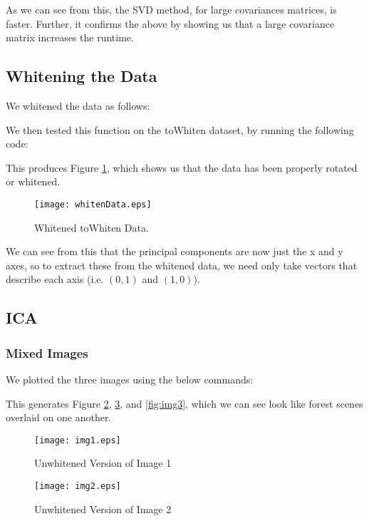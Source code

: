 \documentclass[11pt, oneside]{article}
\begin{document}
As we can see from this, the SVD method, for large covariances matrices, is faster. Further, it confirms the above by showing us that a large covariance matrix increases the runtime.

\subsection{Whitening the Data}

We whitened the data as follows:

We then tested this function on the toWhiten dataset, by running the following code:

This produces Figure \ref{fig:whitenedData}, which shows us that the data has been properly rotated or whitened.

\begin{figure}[ht!]
\texttt{[image: whitenData.eps]}
\caption{Whitened toWhiten Data.}
\label{fig:whitenedData}
\end{figure}

We can see from this that the principal components are now just the x and y axes, so to extract these from the whitened data, we need only take vectors that describe each axis (i.e. $(0, 1)$ and $(1, 0)$).


\subsection{ICA}

\subsubsection{Mixed Images}

We plotted the three images using the below commands:

This generates Figure \ref{fig:img1}, \ref{fig:img2}, and \ref{fig:img3}, which we can see look like forest scenes overlaid on one another.

\begin{figure}[ht!]
\texttt{[image: img1.eps]}
\caption{Unwhitened Version of Image 1}
\label{fig:img1}
\end{figure}

\begin{figure}[ht!]
\texttt{[image: img2.eps]}
\caption{Unwhitened Version of Image 2}
\label{fig:img2}
\end{figure}
\end{document}
